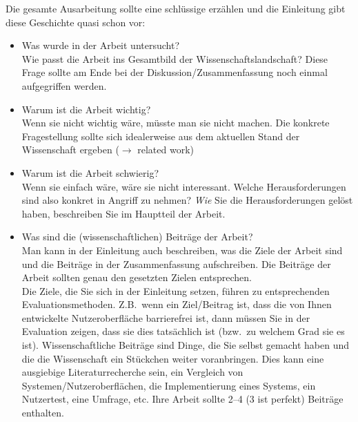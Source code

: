 Die gesamte Ausarbeitung sollte eine schlüssige  erzählen und die Einleitung gibt diese Geschichte quasi schon vor:
\begin{itemize}
  \item Was wurde in der Arbeit untersucht?\\
  Wie passt die Arbeit ins Gesamtbild der Wissenschaftslandschaft? Diese Frage sollte am Ende bei der Diskussion/Zusammenfassung noch einmal aufgegriffen werden.
  \item Warum ist die Arbeit wichtig?\\
  Wenn sie nicht wichtig wäre, müsste man sie nicht machen. Die konkrete Fragestellung sollte sich idealerweise aus dem aktuellen Stand der Wissenschaft ergeben ($\rightarrow$ related work)
  \item Warum ist die Arbeit schwierig?\\
  Wenn sie einfach wäre, wäre sie nicht interessant. Welche Herausforderungen sind also konkret in Angriff zu nehmen? \emph{Wie} Sie die Herausforderungen gelöst haben, beschreiben Sie im Hauptteil der Arbeit.
  \item Was sind die (wissenschaftlichen) Beiträge der Arbeit?\\
  Man kann in der Einleitung auch beschreiben, was die Ziele der Arbeit sind und die Beiträge in der Zusammenfassung aufschreiben. Die Beiträge der Arbeit sollten genau den gesetzten Zielen entsprechen.\\
  Die Ziele, die Sie sich in der Einleitung setzen, führen zu entsprechenden Evaluationsmethoden. Z.B.\ wenn ein Ziel/Beitrag ist, dass die von Ihnen entwickelte Nutzeroberfläche barrierefrei ist, dann müssen Sie in der Evaluation zeigen, dass sie dies tatsächlich ist (bzw.\ zu welchem Grad sie es ist). Wissenschaftliche Beiträge sind Dinge, die Sie selbst gemacht haben und die die Wissenschaft ein Stückchen weiter voranbringen. Dies kann eine ausgiebige Literaturrecherche sein, ein Vergleich von Systemen/Nutzeroberflächen, die Implementierung eines Systems, ein Nutzertest, eine Umfrage, etc. Ihre Arbeit sollte 2--4 (3 ist perfekt) Beiträge enthalten.
\end{itemize}